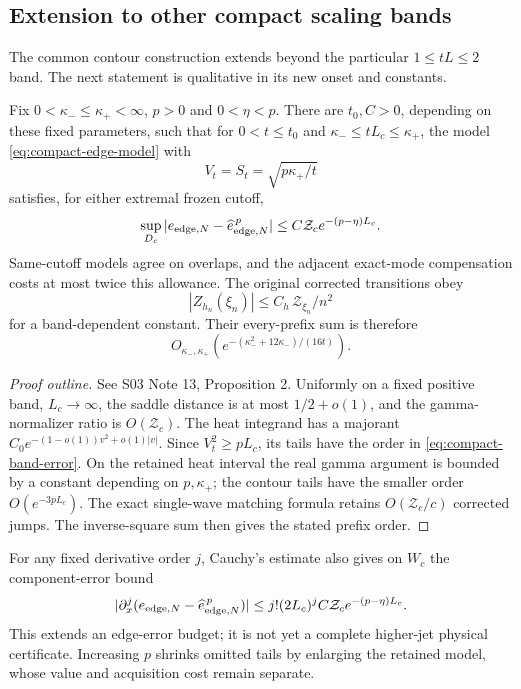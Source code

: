 \subsection{Extension to other compact scaling bands}

The common contour construction extends beyond the particular
$1\le tL\le2$ band. The next statement is qualitative in its new onset
and constants.

\begin{proposition}
\label{prop:compact-band-edge}
Fix $0<\kappa_-\le\kappa_+<\infty$, $p>0$ and $0<\eta<p$.
There are $t_0,C>0$, depending on these fixed parameters, such that
for $0<t\le t_0$ and $\kappa_-\le tL_c\le\kappa_+$, the model
\eqref{eq:compact-edge-model} with
\[
 V_t=S_t=\sqrt{p\kappa_+/t}
\]
satisfies, for either extremal frozen cutoff,
\begin{equation}\label{eq:compact-band-error}
 \sup_{D_c}|e_{{\rm edge},N}
                 -\widehat e_{{\rm edge},N}^{\,p}|
 \le C\mathcal Z_c e^{-(p-\eta)L_c}.
\end{equation}
Same-cutoff models agree on overlaps, and the adjacent exact-mode
compensation costs at most twice this allowance.
The original corrected transitions obey
\[
 |Z_{h_n}(\xi_n)|\le C_h\,\mathcal Z_{\xi_n}/n^2
\]
for a band-dependent constant. Their every-prefix sum is therefore
\[
 O_{\kappa_-,\kappa_+}\left(
 e^{-(\kappa_-^2+12\kappa_-)/(16t)}\right).
\]
\end{proposition}
\begin{proof}[Proof outline]
See
{S03 Note 13, Proposition 2}. Uniformly on a fixed positive band,
$L_c\to\infty$, the saddle distance is at most $1/2+o(1)$,
and the gamma-normalizer ratio is $O(\mathcal Z_c)$.
The heat integrand has a majorant
$C_0e^{-(1-o(1))v^2+o(1)|v|}$.
Since $V_t^2\ge pL_c$, its tails have the order in
\eqref{eq:compact-band-error}.
On the retained heat interval the real gamma argument is bounded
by a constant depending on $p,\kappa_+$; the contour tails have
the smaller order $O(e^{-3pL_c})$.
The exact single-wave matching formula retains
$O(\mathcal Z_c/c)$ corrected jumps. The inverse-square sum then
gives the stated prefix order.
\end{proof}

For any fixed derivative order $j$, Cauchy's estimate also gives on
$W_c$ the component-error bound
\[
 |\partial_x^j(e_{{\rm edge},N}
                   -\widehat e_{{\rm edge},N}^{\,p})|
 \le j!(2L_c)^j C\mathcal Z_c e^{-(p-\eta)L_c}.
\]
This extends an edge-error budget; it is not yet a complete higher-jet
physical certificate. Increasing $p$ shrinks omitted tails by enlarging
the retained model, whose value and acquisition cost remain separate.


